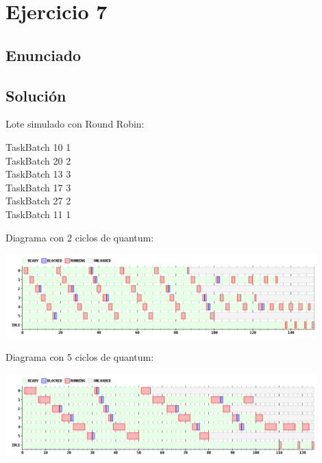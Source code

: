 \section{Ejercicio 7}
\subsection{Enunciado}

\subsection{Soluci\'on}


Lote simulado con Round Robin:

TaskBatch 10 1\\
TaskBatch 20 2\\
TaskBatch 13 3\\
TaskBatch 17 3\\
TaskBatch 27 2\\
TaskBatch 11 1\\

\par Diagrama con 2 ciclos de quantum:

\begin {center}
\includegraphics[width=12cm]{../simusched/outputs/ej7/rr-ej7-1-2.png}
\end {center}

\par Diagrama con 5 ciclos de quantum:
\begin {center}
\includegraphics[width=12cm]{../simusched/outputs/ej7/rr-ej7-1-5.png}
\end {center}

